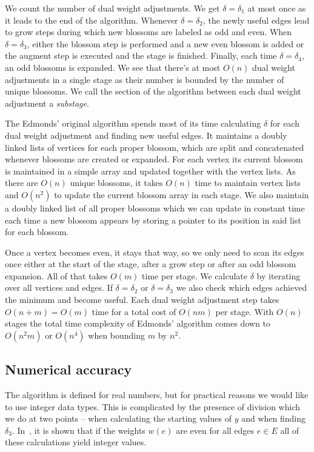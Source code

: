 We count the number of dual weight adjustments. We get $\delta = \delta_1$ at most once as it leads to the end of the algorithm. Whenever $\delta = \delta_2$, the newly useful edges lead to grow steps during which new blossoms are labeled as odd and even. When $\delta = \delta_3$, either the blossom step is performed and a new even blossom is added or the augment step is executed and the stage is finished. Finally, each time $\delta = \delta_4$, an odd blossoms is expanded. We see that there's at most $O(n)$ dual weight adjustments in a single stage as their number is bounded by the number of unique blossoms. We call the section of the algorithm between each dual weight adjustment a \textit{substage}.

The Edmonds' original algorithm spends most of its time calculating $\delta$ for each dual weight adjustment and finding new useful edges. It maintains a doubly linked lists of vertices for each proper blossom, which are split and concatenated whenever blossoms are created or expanded. For each vertex its current blossom is maintained in a simple array and updated together with the vertex lists. As there are $O(n)$ unique blossoms, it takes $O(n)$ time to maintain vertex lists and $O(n^2)$ to update the current blossom array in each stage. We also maintain a doubly linked list of all proper blossoms which we can update in constant time each time a new blossom appears by storing a pointer to its position in said list for each blossom.

Once a vertex becomes even, it stays that way, so we only need to scan its edges once either at the start of the stage, after a grow step or after an odd blossom expansion. All of that takes $O(m)$ time per stage. We calculate $\delta$ by iterating over all vertices and edges. If $\delta = \delta_2$ or $\delta = \delta_3$ we also check which edges achieved the minimum and become useful. Each dual weight adjustment step takes $O(n+m)=O(m)$ time for a total cost of $O(nm)$ per stage. With $O(n)$ stages the total time complexity of Edmonds' algorithm comes down to $O(n^2m)$ or $O(n^4)$ when bounding $m$ by $n^2$.

\subsection{Numerical accuracy}

The algorithm is defined for real numbers, but for practical reasons we would like to use integer data types. This is complicated by the presence of division which we do at two points – when calculating the starting values of $y$ and when finding $\delta_3$. In~\cite{gabow1974implementation}, it is shown that if the weights $w(e)$ are even for all edges $e\in E$ all of these calculations yield integer values.

